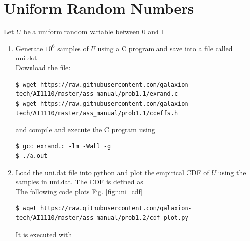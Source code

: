 \documentclass[journal,12pt,twocolumn]{IEEEtran}
\renewcommand\thesection{\arabic{section}}
\begin{document}
\maketitle
\newpage

\tableofcontents
\bigskip
\renewcommand{\thefigure}{\theenumi}
\renewcommand{\thetable}{\theenumi}
\renewcommand{\theequation}{\theenumi}


\section{Uniform Random Numbers}



Let $U$ be a uniform  random variable between 0 and 1
\begin{enumerate}[label=\thesection.\arabic*.,ref=\thesection.\theenumi]
\item Generate $10^6$ samples of $U$ using a C program and save into a file called uni.dat .\\

\solution Download the file:

\begin{lstlisting}
$ wget https://raw.githubusercontent.com/galaxion-tech/AI1110/master/ass_manual/prob1.1/exrand.c
$ wget https://raw.githubusercontent.com/galaxion-tech/AI1110/master/ass_manual/prob1.1/coeffs.h
\end{lstlisting}

and compile and execute the C program using

\begin{lstlisting}
$ gcc exrand.c -lm -Wall -g
$ ./a.out
\end{lstlisting}





\item Load the uni.dat file into python and plot the empirical CDF of $U$ using the samples in uni.dat. The CDF is defined as\\

\solution  The following code plots Fig. \ref{fig:uni_cdf}

\begin{lstlisting}
$ wget https://raw.githubusercontent.com/galaxion-tech/AI1110/master/ass_manual/prob1.2/cdf_plot.py
\end{lstlisting}

It is executed with


\end{enumerate}
\end{document}
